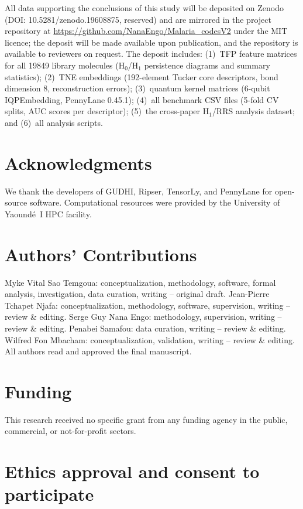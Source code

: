 \documentclass[11pt,a4paper]{article}
\begin{document}
All data supporting the conclusions of this study will be deposited on Zenodo (DOI: 10.5281/zenodo.19608875, reserved) and are mirrored in the project repository at \url{https://github.com/NanaEngo/Malaria_codesV2} under the MIT licence; the deposit will be made available upon publication, and the repository is available to reviewers on request. The deposit includes: (1)~TFP feature matrices for all \num{19849} library molecules (H$_0$/H$_1$ persistence diagrams and summary statistics); (2)~TNE embeddings (\num{192}-element Tucker core descriptors, bond dimension 8, reconstruction errors); (3)~quantum kernel matrices (6-qubit IQPEmbedding, PennyLane 0.45.1); (4)~all benchmark CSV files (5-fold CV splits, AUC scores per descriptor); (5)~the cross-paper H$_1$/RRS analysis dataset; and (6)~all analysis scripts.

\section*{Acknowledgments}

We thank the developers of GUDHI, Ripser, TensorLy, and PennyLane for open-source software. Computational resources were provided by the University of Yaound\'{e}~I HPC facility.

\section*{Authors' Contributions}

Myke Vital Sao Temgoua: conceptualization, methodology, software, formal analysis, investigation, data curation, writing -- original draft. Jean-Pierre Tchapet Njafa: conceptualization, methodology, software, supervision, writing -- review \& editing. Serge Guy Nana Engo: methodology, supervision, writing -- review \& editing. Penabei Samafou: data curation, writing -- review \& editing. Wilfred Fon Mbacham: conceptualization, validation, writing -- review \& editing. All authors read and approved the final manuscript.

\section*{Funding}

This research received no specific grant from any funding agency in the public, commercial, or not-for-profit sectors.

\section*{Ethics approval and consent to participate}
\end{document}
